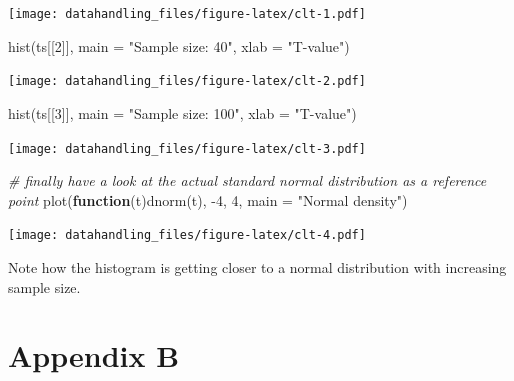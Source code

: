 \documentclass[
  12pt,
]{style/krantz}
\newenvironment{Shaded}{\begin{snugshade}}{\end{snugshade}}
\newcommand{\AttributeTok}[1]{\textcolor[rgb]{0.77,0.63,0.00}{#1}}
\newcommand{\CommentTok}[1]{\textcolor[rgb]{0.56,0.35,0.01}{\textit{#1}}}
\newcommand{\ControlFlowTok}[1]{\textcolor[rgb]{0.13,0.29,0.53}{\textbf{#1}}}
\newcommand{\DecValTok}[1]{\textcolor[rgb]{0.00,0.00,0.81}{#1}}
\newcommand{\FunctionTok}[1]{\textcolor[rgb]{0.00,0.00,0.00}{#1}}
\newcommand{\NormalTok}[1]{#1}
\newcommand{\SpecialCharTok}[1]{\textcolor[rgb]{0.00,0.00,0.00}{#1}}
\newcommand{\StringTok}[1]{\textcolor[rgb]{0.31,0.60,0.02}{#1}}
\begin{document}
\texttt{[image: datahandling\_files/figure-latex/clt-1.pdf]}

\begin{Shaded}
\begin{Highlighting}[]
\FunctionTok{hist}\NormalTok{(ts[[}\DecValTok{2}\NormalTok{]], }\AttributeTok{main =} \StringTok{"Sample size: 40"}\NormalTok{, }\AttributeTok{xlab =} \StringTok{"T{-}value"}\NormalTok{)}
\end{Highlighting}
\end{Shaded}

\texttt{[image: datahandling\_files/figure-latex/clt-2.pdf]}

\begin{Shaded}
\begin{Highlighting}[]
\FunctionTok{hist}\NormalTok{(ts[[}\DecValTok{3}\NormalTok{]], }\AttributeTok{main =} \StringTok{"Sample size: 100"}\NormalTok{, }\AttributeTok{xlab =} \StringTok{"T{-}value"}\NormalTok{)}
\end{Highlighting}
\end{Shaded}

\texttt{[image: datahandling\_files/figure-latex/clt-3.pdf]}

\begin{Shaded}
\begin{Highlighting}[]
\CommentTok{\# finally have a look at the actual standard normal distribution as a reference point}
\FunctionTok{plot}\NormalTok{(}\ControlFlowTok{function}\NormalTok{(t)}\FunctionTok{dnorm}\NormalTok{(t), }\SpecialCharTok{{-}}\DecValTok{4}\NormalTok{, }\DecValTok{4}\NormalTok{, }\AttributeTok{main =} \StringTok{"Normal density"}\NormalTok{)}
\end{Highlighting}
\end{Shaded}

\texttt{[image: datahandling\_files/figure-latex/clt-4.pdf]}

Note how the histogram is getting closer to a normal distribution with increasing sample size.

\hypertarget{appendix-b}{%
\chapter{Appendix B}\label{appendix-b}}

  

\backmatter
\printindex
\end{document}

